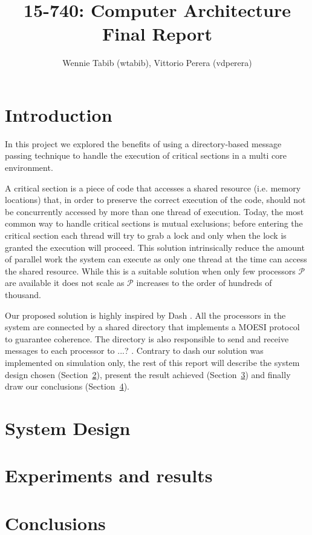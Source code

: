 \documentclass{article}
\title{15-740: Computer Architecture\\
Final Report }
\author{Wennie Tabib (wtabib), Vittorio Perera (vdperera)}
\begin{document}
\maketitle

\section{Introduction}

In this project we explored the benefits of using a directory-based message passing technique to handle the execution of critical sections in a multi core environment.

A critical section is a piece of code that accesses a shared resource (i.e. memory locations) that, in order to preserve the correct execution of the code, should not be concurrently accessed by more than one thread of execution. Today, the most common way to handle critical sections is mutual exclusions; before entering the critical section each thread will try to grab a lock and only when the lock is granted the execution will proceed. 
This solution intrinsically reduce the amount of parallel work the system can execute as only one thread at the time can access the shared resource. 
While this is a suitable solution when only few processors $\mathcal{P}$ are available it does not scale as $\mathcal{P}$ increases to the order of hundreds of thousand.

Our proposed solution is highly inspired by Dash \cite{DASH}. All the processors in the system are connected by a shared directory that implements a MOESI protocol to guarantee coherence. The directory is also responsible to send and receive messages to each processor to ...? . Contrary to dash our solution was implemented on simulation only, the rest of this report will describe the system design chosen (Section~\ref{sec:design}), present the result achieved (Section~\ref{sec:results}) and finally draw our conclusions (Section~\ref{sec:conclusion}).

\section{System Design}\label{sec:design}



\section{Experiments and results}\label{sec:results}


\section{Conclusions}\label{sec:conclusion}




\end{document}

